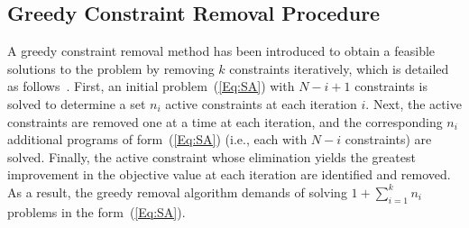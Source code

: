 \documentclass[journal]{IEEEtran}
\begin{document}
\subsection{Greedy Constraint Removal Procedure}
A greedy constraint removal method has been introduced to obtain a feasible solutions to the problem by removing $k$ constraints iteratively, which is detailed as follows~\cite{Pagnoncelli2012risk}. First,  an initial problem~(\ref{Eq:SA}) with $N-i+1$ constraints is solved to determine a set $n_i$ active constraints at each iteration $i$. Next, the active constraints are removed one at a time at each iteration, and the corresponding $n_i$ additional programs of form~(\ref{Eq:SA}) (i.e., each with $N-i$ constraints) are solved. Finally, the active constraint whose elimination yields the greatest improvement in the objective value at each iteration are identified and removed. As a result, the greedy removal algorithm demands of solving $1+ \sum_{i=1}^{k} n_i$ problems in the form~(\ref{Eq:SA}).
\end{document}
